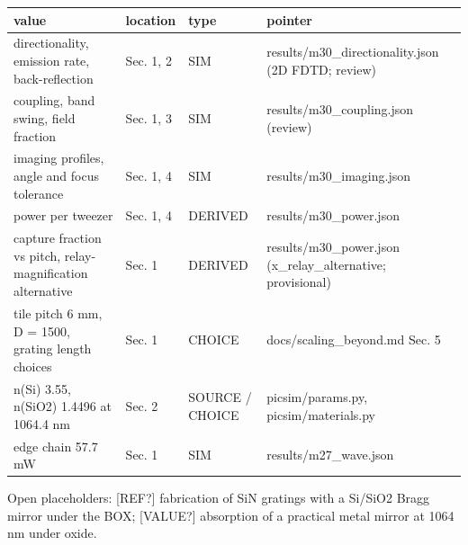 {\footnotesize
\begin{longtable}[]{@{}>{\raggedright\arraybackslash}p{0.309\dimexpr(\linewidth-8\tabcolsep)\relax}>{\raggedright\arraybackslash}p{0.117\dimexpr(\linewidth-8\tabcolsep)\relax}>{\raggedright\arraybackslash}p{0.101\dimexpr(\linewidth-8\tabcolsep)\relax}>{\raggedright\arraybackslash}p{0.473\dimexpr(\linewidth-8\tabcolsep)\relax}@{}}
\toprule\noalign{}
value & location & type & pointer \\
\midrule\noalign{}
\endhead
\bottomrule\noalign{}
\endlastfoot
directionality, emission rate, back-reflection & Sec. 1, 2 & SIM &
results/m30\_directionality.json (2D FDTD; review) \\
coupling, band swing, field fraction & Sec. 1, 3 & SIM &
results/m30\_coupling.json (review) \\
imaging profiles, angle and focus tolerance & Sec. 1, 4 & SIM &
results/m30\_imaging.json \\
power per tweezer & Sec. 1, 4 & DERIVED & results/m30\_power.json \\
capture fraction vs pitch, relay-magnification alternative & Sec. 1 &
DERIVED & results/m30\_power.json (x\_relay\_alternative;
provisional) \\
tile pitch 6 mm, D = 1500, grating length choices & Sec. 1 & CHOICE &
docs/scaling\_beyond.md Sec. 5 \\
n(Si) 3.55, n(SiO2) 1.4496 at 1064.4 nm & Sec. 2 & SOURCE / CHOICE &
picsim/params.py, picsim/materials.py \\
edge chain 57.7 mW & Sec. 1 & SIM & results/m27\_wave.json \\
\end{longtable}
}

Open placeholders: {[}REF?{]} fabrication of SiN gratings with a Si/SiO2
Bragg mirror under the BOX; {[}VALUE?{]} absorption of a practical metal
mirror at 1064 nm under oxide.

